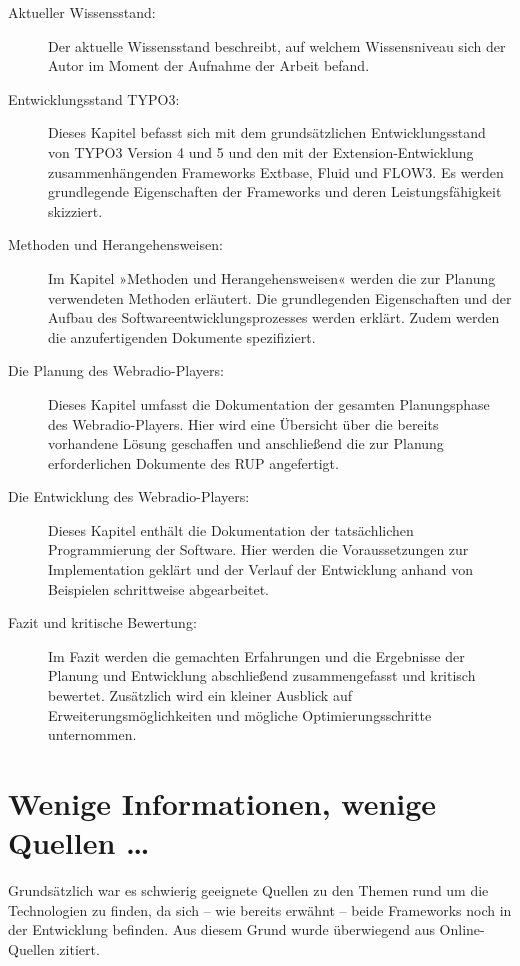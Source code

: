\begin{description}

	\item[Aktueller Wissensstand:] Der aktuelle Wissensstand beschreibt, auf welchem Wissensniveau sich der Autor im Moment der Aufnahme der Arbeit befand.
	
	\item[Entwicklungsstand TYPO3:] Dieses Kapitel befasst sich mit dem grunds\"atzlichen Entwicklungsstand von TYPO3 Version 4 und 5 und den mit der Extension-Entwicklung zusammenh\"angenden Frameworks Extbase, Fluid und FLOW3. Es werden grundlegende Eigenschaften der Frameworks und deren Leistungsf\"ahigkeit skizziert.
	
	\item[Methoden und Herangehensweisen:] Im Kapitel »Methoden und Herangehensweisen« werden die zur Planung verwendeten Methoden erl\"autert. Die grundlegenden Eigenschaften und der Aufbau des Softwareentwicklungsprozesses  werden erkl\"art. Zudem werden die anzufertigenden Dokumente spezifiziert.
	
	\item[Die Planung des Webradio-Players:] Dieses Kapitel umfasst die Dokumentation der gesamten Planungsphase des Webradio-Players. Hier wird eine \"Ubersicht \"uber die bereits vorhandene L\"osung geschaffen und anschlie{\ss}end die zur Planung erforderlichen Dokumente des RUP angefertigt.
	
	\item[Die Entwicklung des Webradio-Players:] Dieses Kapitel enth\"alt die Dokumentation der tats\"achlichen Programmierung der Software. Hier werden die Voraussetzungen zur Implementation gekl\"art und der Verlauf der Entwicklung anhand von Beispielen schrittweise abgearbeitet.
	
	\item[Fazit und kritische Bewertung:] Im Fazit werden die gemachten Erfahrungen und die Ergebnisse der Planung und Entwicklung abschlie{\ss}end zusammengefasst und kritisch bewertet. Zus\"atzlich wird ein kleiner Ausblick auf Erweiterungsm\"oglichkeiten und m\"ogliche Optimierungsschritte unternommen.

\end{description}


\section{Wenige Informationen, wenige Quellen \dots}
\label{sec:Quellenlage}

Grunds\"atzlich war es schwierig geeignete Quellen zu den Themen rund um die Technologien zu finden, da sich -- wie bereits erw\"ahnt -- beide Frameworks noch in der Entwicklung befinden. Aus diesem Grund wurde \"uberwiegend aus Online-Quellen zitiert.

